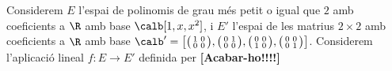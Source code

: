 \begin{exemple}
	Considerem $E$ l'espai de polinomis de grau més petit o igual que $2$ amb coeficients a $\R$ amb base $\calb [1,x,x^2]$, i $E'$ l'espai de les matrius $2\times 2$ amb coeficients a $\R$ amb base 
	$\calb'=\big[\big(\begin{smallmatrix}1&0\\0&0\end{smallmatrix}\big),\big(\begin{smallmatrix}0&1\\0&0\end{smallmatrix}\big),\big(\begin{smallmatrix}0&0\\1&0\end{smallmatrix}\big),\big(\begin{smallmatrix}0&0\\0&1\end{smallmatrix}\big) \big]$. Considerem l'aplicació lineal $f\colon E \to E'$ definida per \textbf{[Acabar-ho!!!!]}
\end{exemple}

